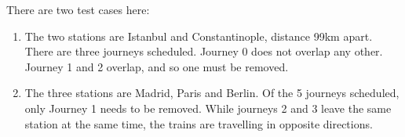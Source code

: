There are two test cases here:

\begin{enumerate}
    \item The two stations are Istanbul and Constantinople, distance 99km apart. 
    \\ There are three journeys scheduled. Journey 0 does not overlap any other.
    Journey 1 and 2 overlap, and so one must be removed.
    \item The three stations are Madrid, Paris and Berlin.
    Of the 5 journeys scheduled, only Journey 1 needs to be removed. While journeys 2 and 3 leave the same station at the same time, the trains are travelling in opposite directions.
\end{enumerate}